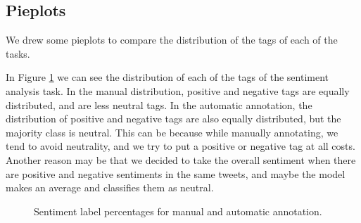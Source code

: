 \documentclass[11pt,a4paper]{article}
\begin{document}
\subsection{Pieplots}

We drew some pieplots to compare the distribution of the tags of each of the tasks. 

In Figure \ref{fig:pieplots_sentiment} we can see the distribution of each of the tags of the sentiment analysis task. In the manual distribution, positive and negative tags are equally distributed, and are less neutral tags. In the automatic annotation, the distribution of positive and negative tags are also equally distributed, but the majority class is neutral. This can be because while manually annotating, we tend to avoid neutrality, and we try to put a positive or negative tag at all costs. Another reason may be that we decided to take the overall sentiment when there are positive and negative sentiments in the same tweets, and maybe the model makes an average and classifies them as neutral.

\begin{figure}[ht]
    \centering
    \caption{Sentiment label percentages for manual and automatic annotation.}
    \label{fig:pieplots_sentiment}
\end{figure}
\end{document}
